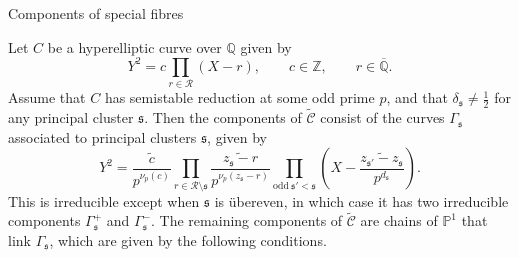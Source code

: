 \documentclass[10pt]{beamer}
\begin{document}
\begin{frame}[t]{Components of special fibres}

\begin{theorem}[M2D2, Theorem 8.6(1)]
Let $ C $ be a hyperelliptic curve over $ \mathbb{Q} $ given by
$$ Y^2 = c\prod_{r \in \mathcal{R}} (X - r), \qquad c \in \mathbb{Z}, \qquad r \in \overline{\mathbb{Q}}. $$
Assume that $ C $ has semistable reduction at some odd prime $ p $, and that $ \delta_\mathfrak{s} \ne \tfrac{1}{2} $ for any principal cluster $ \mathfrak{s} $. Then the components of $ \widetilde{\mathcal{C}} $ consist of the curves $ \Gamma_\mathfrak{s} $ associated to principal clusters $ \mathfrak{s} $, given by
$$ Y^2 = \widetilde{\dfrac{c}{p^{\nu_p(c)}}}\prod_{r \in \mathcal{R} \setminus \mathfrak{s}} \widetilde{\dfrac{z_\mathfrak{s} - r}{p^{\nu_p(z_\mathfrak{s} - r)}}}\prod_{\text{odd} \ \mathfrak{s}' < \mathfrak{s}} \left(X - \widetilde{\dfrac{z_{\mathfrak{s}'} - z_\mathfrak{s}}{p^{d_\mathfrak{s}}}}\right). $$
This is irreducible except when $ \mathfrak{s} $ is \"ubereven, in which case it has two irreducible components $ \Gamma_\mathfrak{s}^+ $ and $ \Gamma_\mathfrak{s}^- $. The remaining components of $ \widetilde{\mathcal{C}} $ are chains of $ \mathbb{P}^1 $ that link $ \Gamma_\mathfrak{s} $, which are given by the following conditions.
\end{theorem}

\end{frame}
\end{document}
